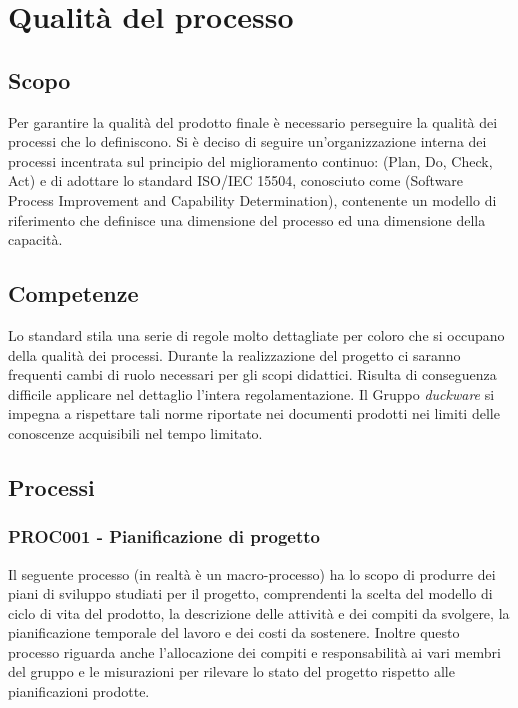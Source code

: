 \clearpage
\section{Qualità del processo}
\label{sec:qualita_processo}
\subsection{Scopo}
\label{sec:qualita_processo_scopo}
Per garantire la qualità del prodotto finale è necessario perseguire la qualità dei processi che lo definiscono. Si è deciso di seguire un'organizzazione interna dei processi incentrata sul principio del miglioramento continuo:  (Plan, Do, Check, Act) e di adottare lo standard ISO/IEC 15504, conosciuto come  (Software Process Improvement and Capability Determination), contenente un modello di riferimento che definisce una dimensione del processo ed una dimensione della capacità.
\subsection{Competenze}
\label{sec:qualita_processo_competenze}
Lo standard stila una serie di regole molto dettagliate per coloro che si occupano della qualità dei processi. Durante la realizzazione del progetto ci saranno frequenti cambi di ruolo necessari per gli scopi didattici. Risulta di conseguenza difficile applicare nel dettaglio l'intera regolamentazione. Il Gruppo \emph{duckware} si impegna a rispettare tali norme riportate nei documenti prodotti nei limiti delle conoscenze acquisibili nel tempo limitato.
\subsection{Processi}
\label{sec:processi}
\subsubsection{PROC001 - Pianificazione di progetto}
\label{sec:processo_pianificazione_progetto}
Il seguente processo (in realtà è un macro-processo) ha lo scopo di produrre dei piani di sviluppo studiati per il progetto, comprendenti la scelta del modello di ciclo di vita del prodotto, la descrizione delle attività e dei compiti da svolgere, la pianificazione temporale del lavoro e dei costi da sostenere. Inoltre questo processo riguarda anche l'allocazione dei compiti e responsabilità ai vari membri del gruppo e le misurazioni per rilevare lo stato del progetto rispetto alle pianificazioni prodotte.\\
